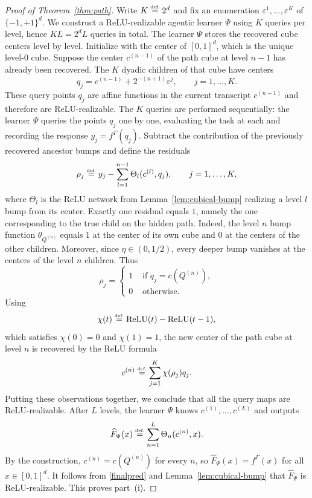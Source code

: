 \documentclass{article}
\newcommand{\eqdef }{\ensuremath{\stackrel{\mbox{\upshape\tiny def.}}{=}}}
\newcommand{\ReLU}{\operatorname{ReLU}}
\begin{document}
\begin{proof}[Proof of Theorem~\ref{thm:path}]
Write $K\eqdef  2^d$ and fix an enumeration $\varepsilon^1,\dots,\varepsilon^K$ of $\{-1,+1\}^d$. 
We construct a ReLU-realizable agentic learner $\Psi$ using $K$ queries per level, hence
$KL=2^dL$ queries in total.
The learner $\Psi$ stores the recovered cube centers level by level. Initialize with the center of
$[0,1]^d$, which is the unique level-$0$ cube. Suppose the center $c^{(n-1)}$ of the path cube at
level $n-1$ has already been recovered. The $K$ dyadic children of that cube have centers
\[
q_j=c^{(n-1)}+2^{-(n+1)}\varepsilon^j,
\qquad j=1,\dots,K.
\]
These query points $q_j$ are affine functions in the current %
transcript $c^{(n-1)}$ and therefore are ReLU-realizable. 
The $K$ queries are performed sequentially: the learner $\Psi$ queries the points $q_j$ one by one, evaluating the task at each %
and recording the response $y_j=f^{\Gamma}(q_j)$. 
Subtract the contribution of the previously recovered ancestor bumps and define the residuals 
\[
\rho_j
\eqdef 
y_j-\sum_{l=1}^{n-1}\Theta_l(c^{(l)},q_j),
\qquad j=1,\dots,K,
\]
where $\Theta_l$ is the ReLU network from Lemma~\ref{lem:cubical-bump} realizing a level $l$ bump
from its center. Exactly one residual equals $1$, namely the one corresponding to the true child on
the hidden path. Indeed, the level $n$ bump function $\theta_{Q^{(n)}}$ equals $1$ at the center of its own cube and $0$ at
the centers of the other children. 
Moreover, since $\eta\in (0,1/2)$, every deeper bump vanishes at the centers of the level $n$ children. Thus
\[
\rho_j=
\begin{cases}
1 &\text{ if }q_j=c(Q^{(n)}),\\
0 &\text{ otherwise.}
\end{cases}
\]
Using
\[
\chi(t)\eqdef  \ReLU(t)-\ReLU(t-1),
\]
which satisfies $\chi(0)=0$ and $\chi(1)=1$, the new center of the path cube at level $n$ is recovered by the ReLU formula
\[
c^{(n)}\eqdef\sum_{j=1}^K \chi(\rho_j)q_j.
\]
Putting these observations together, we conclude that all the query maps are %
ReLU-realizable.
After $L$ levels, the learner $\Psi$ knows $c^{(1)},\dots,c^{(L)}$ and outputs
\begin{equation} \label{finalpred}
    \widehat{F}_{\Psi}(x)\eqdef\sum_{n=1}^L \Theta_n(c^{(n)},x).
\end{equation}
By the construction, $c^{(n)}=c(Q^{(n)})$ for every $n$, so $\widehat{F}_{\Psi}(x)=f^\Gamma(x)$ for all $x\in[0,1]^d$.
It follows from \eqref{finalpred} and Lemma~\ref{lem:cubical-bump} that $\widehat{F}_{\Psi}$ is ReLU-realizable. 
This proves part~(i). 



\end{proof}
\end{document}
